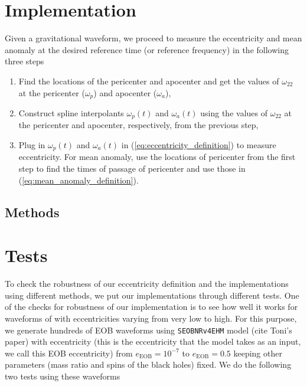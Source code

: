 \documentclass[aps,prd,amsmath,floats,floatfix, twocolumn,
superscriptaddress,nofootinbib,showpacs]{revtex4-1}
\begin{document}
\section{Implementation}
\label{sec:implementation}
Given a gravitational waveform, we proceed to measure the eccentricity and mean anomaly at the desired reference time (or reference frequency) in the following three steps
\begin{enumerate}
\item Find the locations of the pericenter and apocenter and get the values of $\omega_{22}$ at the pericenter ($\omega_p$) and apocenter ($\omega_a$),
\item Construct spline interpolants $\omega_p(t)$ and $\omega_a(t)$ using the values of $\omega_{22}$ at the pericenter and apocenter, respectively, from the previous step,
\item Plug in $\omega_p(t)$ and $\omega_a(t)$ in (\ref{eq:eccentricity_definition}) to measure eccentricity. For mean anomaly, use the locations of pericenter from the first step to find the times of
  passage of pericenter and use those in (\ref{eq:mean_anomaly_definition}).
\end{enumerate}
\subsection{Methods}
\label{sec:methods}

\section{Tests}
\label{sec:tests}
To check the robustness of our eccentricity definition and the implementations using different methods, we put our implementations
through different tests. One of the checks for robustness of our implementation is to see how well it works for waveforms of with eccentricities
varying from very low to high. For this purpose, we generate hundreds of EOB waveforms using \texttt{SEOBNRv4EHM} model (cite Toni's paper) with eccentricity
(this is the eccentricity that the model takes as an input, we call this EOB eccentricity) from $e_{\text{EOB}} = 10^{-7}$ to $e_{\text{EOB}} = 0.5$ keeping
other parameters (mass ratio and spins of the black holes) fixed. We do the following two tests using these waveforms
\end{document}
